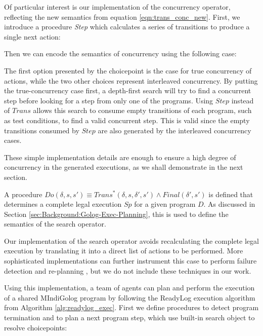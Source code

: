 

Of particular interest is our implementation of the concurrency operator,
reflecting the new semantics from equation \eqref{eqn:trans_conc_new}.
First, we introduce a procedure \emph{Step} which calculates a series
of transitions to produce a single next action:


Then we can encode the semantics of concurrency using the following
case:


The first option presented by the choicepoint is the case for true
concurrency of actions, while the two other choices represent interleaved
concurrency. By putting the true-concurrency case first, a depth-first
search will try to find a concurrent step before looking for a step
from only one of the programs. Using $Step$ instead of $Trans$ allows
this search to consume empty transitions of each program, such as
test conditions, to find a valid concurrent step. This is valid since
the empty transitions consumed by $Step$ are also generated by the
interleaved concurrency cases.

These simple implementation details are enough to ensure a high degree
of concurrency in the generated executions, as we shall demonstrate
in the next section.

A procedure $Do(\delta,s,s')\equiv Trans^{*}(\delta,s,\delta',s')\wedge Final(\delta',s')$
is defined that determines a complete legal execution $Sp$ for a
given program $D$. As discussed in Section \ref{sec:Background:Golog-Exec-Planning},
this is used to define the semantics of the search operator.


Our implementation of the search operator avoids recalculating the
complete legal execution by translating it into a direct list of actions
to be performed. More sophisticated implementations can further instrument
this case to perform failure detection and re-planning \citep{Lesperance00improved_indigolog},
but we do not include these techniques in our work.


Using this implementation, a team of agents can plan and perform the
execution of a shared MIndiGolog program by following the ReadyLog
execution algorithm from Algorithm \ref{alg:readylog_exec}. First
we define procedures to detect program termination and to plan a next
program step, which use built-in search object to resolve choicepoints:

